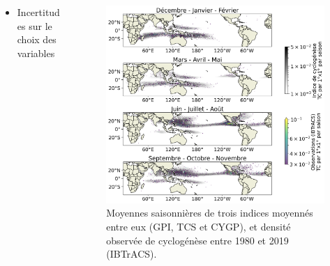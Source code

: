 \documentclass[aspectratio=169, usepdftitle=false, xcolor={dvipsnames}, 9pt,table]{beamer}
\begin{document}
\begin{frame}[t]
\begin{columns}[t]
\begin{column}{0.5\textwidth}
\begin{columns}[t]
\begin{column}{0.45\textwidth}
{\begin{alertblock}[Inconvénients]
\begin{itemize}
                                \vspace{1ex}
                                \item Incertitudes sur le choix des variables
                            \end{itemize}
                        \end{alertblock}
                    }
                \end{column}
            \end{columns}
        \end{column}
        \begin{column}{0.5\textwidth}
            \vspace{-3em}
            \begin{figure}
                \centering
                \includegraphics[width=\textwidth]{Figures/acgi_mean_IBTrACS_season.png}
                \caption{Moyennes saisonnières de trois indices moyennés entre eux (GPI, TCS et CYGP), et densité observée de cyclogénèse entre 1980 et 2019
                (IBTrACS).}
            \end{figure}        
        \end{column}
    \end{columns}
\end{frame}

\end{document}
